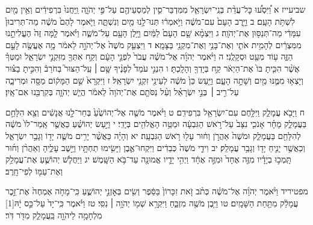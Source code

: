 \documentclass[twoside, openany, parskip=half, 11pt]{book}
\begin{document}
שביעייז א וַ֠יִּסְע֠וּ כׇּל־עֲדַ֨ת בְּנֵֽי־יִשְׂרָאֵ֧ל מִמִּדְבַּר־סִ֛ין לְמַסְעֵיהֶ֖ם עַל־פִּ֣י יְהֹוָ֑ה וַֽיַּחֲנוּ֙ בִּרְפִידִ֔ים וְאֵ֥ין מַ֖יִם לִשְׁתֹּ֥ת הָעָֽם׃ ב וַיָּ֤רֶב הָעָם֙ עִם־מֹשֶׁ֔ה וַיֹּ֣אמְר֔וּ תְּנוּ־לָ֥נוּ מַ֖יִם וְנִשְׁתֶּ֑ה וַיֹּ֤אמֶר לָהֶם֙ מֹשֶׁ֔ה מַה־תְּרִיבוּן֙ עִמָּדִ֔י מַה־תְּנַסּ֖וּן אֶת־יְהֹוָֽה׃ ג וַיִּצְמָ֨א שָׁ֤ם הָעָם֙ לַמַּ֔יִם וַיָּ֥לֶן הָעָ֖ם עַל־מֹשֶׁ֑ה וַיֹּ֗אמֶר לָ֤מָּה זֶּה֙ הֶעֱלִיתָ֣נוּ מִמִּצְרַ֔יִם לְהָמִ֥ית אֹתִ֛י וְאֶת־בָּנַ֥י וְאֶת־מִקְנַ֖י בַּצָּמָֽא׃ ד וַיִּצְעַ֤ק מֹשֶׁה֙ אֶל־יְהֹוָ֣ה לֵאמֹ֔ר מָ֥ה אֶעֱשֶׂ֖ה לָעָ֣ם הַזֶּ֑ה ע֥וֹד מְעַ֖ט וּסְקָלֻֽנִי׃ ה וַיֹּ֨אמֶר יְהֹוָ֜ה אֶל־מֹשֶׁ֗ה עֲבֹר֙ לִפְנֵ֣י הָעָ֔ם וְקַ֥ח אִתְּךָ֖ מִזִּקְנֵ֣י יִשְׂרָאֵ֑ל וּמַטְּךָ֗ אֲשֶׁ֨ר הִכִּ֤יתָ בּוֹ֙ אֶת־הַיְאֹ֔ר קַ֥ח בְּיָדְךָ֖ וְהָלָֽכְתָּ׃ ו הִנְנִ֣י עֹמֵד֩ לְפָנֶ֨יךָ שָּׁ֥ם ׀ עַֽל־הַצּוּר֮ בְּחֹרֵב֒ וְהִכִּ֣יתָ בַצּ֗וּר וְיָצְא֥וּ מִמֶּ֛נּוּ מַ֖יִם וְשָׁתָ֣ה הָעָ֑ם וַיַּ֤עַשׂ כֵּן֙ מֹשֶׁ֔ה לְעֵינֵ֖י זִקְנֵ֥י יִשְׂרָאֵֽל׃ ז וַיִּקְרָא֙ שֵׁ֣ם הַמָּק֔וֹם מַסָּ֖ה וּמְרִיבָ֑ה עַל־רִ֣יב ׀ בְּנֵ֣י יִשְׂרָאֵ֗ל וְעַ֨ל נַסֹּתָ֤ם אֶת־יְהֹוָה֙ לֵאמֹ֔ר הֲיֵ֧שׁ יְהֹוָ֛ה בְּקִרְבֵּ֖נוּ אִם־אָֽיִן׃

ח וַיָּבֹ֖א עֲמָלֵ֑ק וַיִּלָּ֥חֶם עִם־יִשְׂרָאֵ֖ל בִּרְפִידִֽם׃ ט וַיֹּ֨אמֶר מֹשֶׁ֤ה אֶל־יְהוֹשֻׁ֙עַ֙ בְּחַר־לָ֣נוּ אֲנָשִׁ֔ים וְצֵ֖א הִלָּחֵ֣ם בַּעֲמָלֵ֑ק מָחָ֗ר אָנֹכִ֤י נִצָּב֙ עַל־רֹ֣אשׁ הַגִּבְעָ֔ה וּמַטֵּ֥ה הָאֱלֹהִ֖ים בְּיָדִֽי׃ י וַיַּ֣עַשׂ יְהוֹשֻׁ֗עַ כַּאֲשֶׁ֤ר אָֽמַר־לוֹ֙ מֹשֶׁ֔ה לְהִלָּחֵ֖ם בַּעֲמָלֵ֑ק וּמֹשֶׁה֙ אַהֲרֹ֣ן וְח֔וּר עָל֖וּ רֹ֥אשׁ הַגִּבְעָֽה׃ יא וְהָיָ֗ה כַּאֲשֶׁ֨ר יָרִ֥ים מֹשֶׁ֛ה יָד֖וֹ וְגָבַ֣ר יִשְׂרָאֵ֑ל וְכַאֲשֶׁ֥ר יָנִ֛יחַ יָד֖וֹ וְגָבַ֥ר עֲמָלֵֽק׃ יב וִידֵ֤י מֹשֶׁה֙ כְּבֵדִ֔ים וַיִּקְחוּ־אֶ֛בֶן וַיָּשִׂ֥ימוּ תַחְתָּ֖יו וַיֵּ֣שֶׁב עָלֶ֑יהָ וְאַהֲרֹ֨ן וְח֜וּר תָּֽמְכ֣וּ בְיָדָ֗יו מִזֶּ֤ה אֶחָד֙ וּמִזֶּ֣ה אֶחָ֔ד וַיְהִ֥י יָדָ֛יו אֱמוּנָ֖ה עַד־בֹּ֥א הַשָּֽׁמֶשׁ׃ יג וַיַּחֲלֹ֧שׁ יְהוֹשֻׁ֛עַ אֶת־עֲמָלֵ֥ק וְאֶת־עַמּ֖וֹ לְפִי־חָֽרֶב׃

מפטיריד וַיֹּ֨אמֶר יְהֹוָ֜ה אֶל־מֹשֶׁ֗ה כְּתֹ֨ב זֹ֤את זִכָּרוֹן֙ בַּסֵּ֔פֶר וְשִׂ֖ים בְּאׇזְנֵ֣י יְהוֹשֻׁ֑עַ כִּֽי־מָחֹ֤ה אֶמְחֶה֙ אֶת־זֵ֣כֶר עֲמָלֵ֔ק מִתַּ֖חַת הַשָּׁמָֽיִם׃ טו וַיִּ֥בֶן מֹשֶׁ֖ה מִזְבֵּ֑חַ וַיִּקְרָ֥א שְׁמ֖וֹ יְהֹוָ֥ה ׀ נִסִּֽי׃ טז וַיֹּ֗אמֶר כִּֽי־יָד֙ עַל־כֵּ֣ס יָ֔הּ‏[1] מִלְחָמָ֥ה לַיהֹוָ֖ה בַּֽעֲמָלֵ֑ק מִדֹּ֖ר דֹּֽר׃
\end{document}
